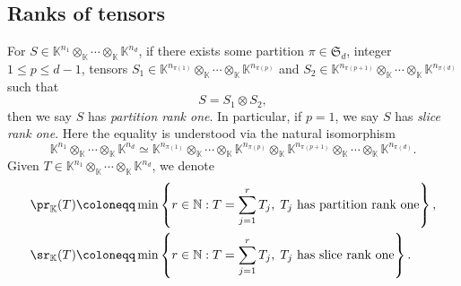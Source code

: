 \subsection{Ranks of tensors}
For $S \in \mathbb{K}^{n_1} \otimes_{\mathbb{K}} \cdots \otimes_{\mathbb{K}} \mathbb{K}^{n_d}$,  if there exists some partition $\pi \in \mathfrak{S}_d$,  integer $1 \le p \le d-1$,  tensors $S_1 \in \mathbb{K}^{n_{\pi(1)}} \otimes_{\mathbb{K}} \cdots \otimes_{\mathbb{K}}  \mathbb{K}^{n_{\pi(p)}}$ and $S_2 \in \mathbb{K}^{n_{\pi(p+1)}} \otimes_{\mathbb{K}} \cdots \otimes_{\mathbb{K}} \mathbb{K}^{n_{\pi(d)}}$ such that
\[
S  = S_1 \otimes S_2,
\]
then we say $S$ has \emph{partition rank one}.  In particular,  if $p = 1$,  we say $S$ has \emph{slice rank one}.  Here the equality is understood via the natural isomorphism 
\[
\mathbb{K}^{n_1} \otimes_{\mathbb{K}} \cdots \otimes_{\mathbb{K}} \mathbb{K}^{n_d} \simeq 
\mathbb{K}^{n_{\pi(1)}} \otimes_{\mathbb{K}} \cdots \otimes_{\mathbb{K}}  \mathbb{K}^{n_{\pi(p)}}  \otimes_{\mathbb{K}}   \mathbb{K}^{n_{\pi(p+1)}} \otimes_{\mathbb{K}} \cdots \otimes_{\mathbb{K}}  \mathbb{K}^{n_{\pi(d)}}. 
\]
Given $T \in \mathbb{K}^{n_1} \otimes_{\mathbb{K}}  \cdots \otimes_{\mathbb{K}} \mathbb{K}^{n_d}$,  we denote 
\begin{align}
\pr_{\mathbb{K}}(T) &\coloneqq \min \left\lbrace
r \in \mathbb{N}: T = \sum_{j=1}^r T_j,\; T_j \text{~has partition rank one}
\right\rbrace,  \label{eq:PR} \\
\sr_{\mathbb{K}}(T) &\coloneqq \min \left\lbrace
r \in \mathbb{N}: T = \sum_{j=1}^r T_j,\; T_j \text{~has slice rank one}
\right\rbrace.  \label{eq:SR}
\end{align}
